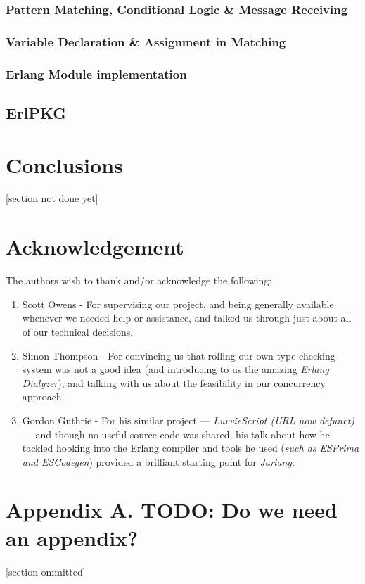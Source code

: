 \documentclass[twoside,12pt,titlepage,a4paper]{article}
\begin{document}
\subsubsection{Pattern Matching, Conditional Logic \& Message Receiving}
\subsubsection{Variable Declaration \& Assignment in Matching}
\subsubsection{Erlang Module implementation} \label{sssec:num1}
\subsection{ErlPKG}

\section{Conclusions}
\label{Conclusions}

[section not done yet]

\section{Acknowledgement}
The authors wish to thank and/or acknowledge the following:
\begin{enumerate}
\item Scott Owens - For supervising our project, and being generally available whenever we needed help or assistance, and talked us through just about all of our technical decisions.
\item Simon Thompson - For convincing us that rolling our own type checking system was not a good idea (and introducing to us the amazing \textit{Erlang Dialyzer}), and talking with us about the feasibility in our concurrency approach.
\item Gordon Guthrie - For his similar project --- \textit{LuvvieScript (URL now defunct)} --- and though no useful source-code was shared, his talk about how he tackled hooking into the Erlang compiler and tools he used (\textit{such as ESPrima and ESCodegen}) provided a brilliant starting point for \textit{Jarlang}.
\end{enumerate}
\appendix
\section*{Appendix A. TODO: Do we need an appendix?}


[section ommitted]



\vskip 0.2in


\end{document}
